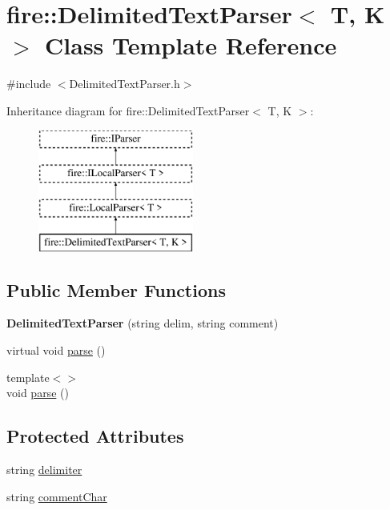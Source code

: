 \hypertarget{a01369}{}\section{fire\+:\+:Delimited\+Text\+Parser$<$ T, K $>$ Class Template Reference}
\label{a01369}


{\ttfamily \#include $<$Delimited\+Text\+Parser.\+h$>$}

Inheritance diagram for fire\+:\+:Delimited\+Text\+Parser$<$ T, K $>$\+:\begin{figure}[H]
\begin{center}
\leavevmode
\includegraphics[height=4.000000cm]{a01369}
\end{center}
\end{figure}
\subsection*{Public Member Functions}
\begin{DoxyCompactItemize}
\item 
\mbox{\label{a01369_aa1f041ebbf0bf72145e8bd20bf95f3f4}} 
{\bfseries Delimited\+Text\+Parser} (string delim, string comment)
\item 
virtual void \hyperlink{a01369_a686df5548771cae833d5e721442a821a}{parse} ()
\item 
{\footnotesize template$<$$>$ }\\void \hyperlink{a01369_a773fa7ed28cb9d8c384ad94bd81fc93f}{parse} ()
\end{DoxyCompactItemize}
\subsection*{Protected Attributes}
\begin{DoxyCompactItemize}
\item 
string \hyperlink{a01369_ac817fc333b53611a41f446977461bdbf}{delimiter}
\item 
string \hyperlink{a01369_acdd7b27b8109ed41e7d9bc5e6de72e93}{comment\+Char}
\end{DoxyCompactItemize}


